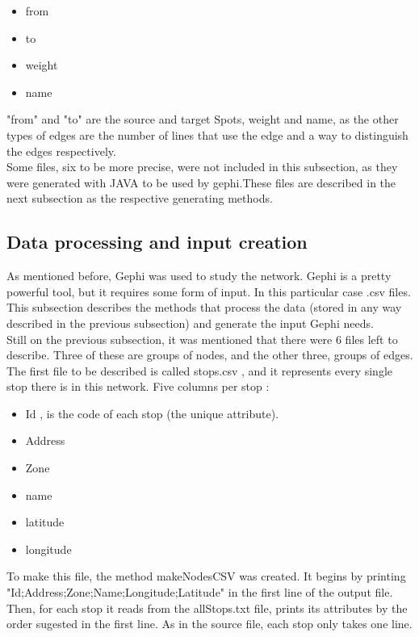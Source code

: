 \documentclass[12pt]{article}
\begin{document}
\begin{multicols}{2}
\begin{itemize}
    \item from
    \item to
    \item weight
    \item name
\end{itemize}

"from" and "to" are the source and target Spots, weight and name, as the other types of edges are the number of lines that use the edge and a way to distinguish the edges respectively.\\
Some files, six to be more precise, were not included in this subsection, as they were generated with JAVA to be used by gephi.These files are described in the next subsection as the respective generating methods.

\subsection{Data processing and input creation}
	
	As mentioned before, Gephi was used to study the network. Gephi is a pretty powerful tool, but it requires some form of input. In this particular case .csv files. This subsection describes the methods that process the data (stored in any way described in the previous subsection) and generate the input Gephi needs.\\
	Still on the previous subsection, it was mentioned that there were 6 files left to describe. Three of these are groups of nodes, and the other three, groups of edges.\\
	
	
The first file to be described is called stops.csv , and it represents every single stop there is in this network. Five columns per stop :
	
	\begin{itemize}
		\item Id , is the code of each stop (the unique attribute).
		\item Address
		\item Zone
		\item name
		\item latitude
		\item longitude
	\end{itemize}
	
	To make this file, the method makeNodesCSV was created.
	It begins by printing "Id;Address;Zone;Name;Longitude;Latitude" in the first line of the output file. Then, for each stop it reads from the allStops.txt file, prints its attributes by the order sugested in the first line. As in the source file, each stop only takes one line.
	

\end{multicols}
\end{document}
